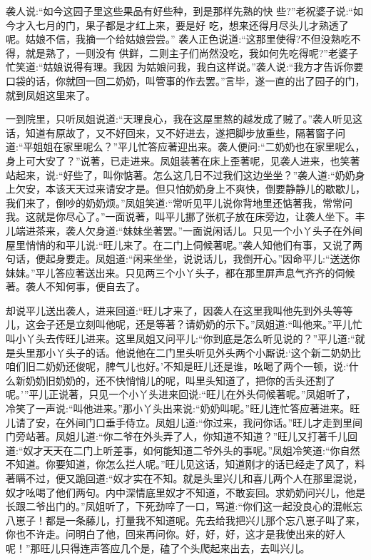 \begin{parag}
    袭人说:“如今这园子里这些果品有好些种，到是那样先熟的快
    些?”老祝婆子说:“如今才入七月的门，果子都是才红上来，要是好
    吃，想来还得月尽头儿才熟透了呢。姑娘不信，我摘一个给姑娘尝尝。”
    袭人正色说道:“这那里使得?不但没熟吃不得，就是熟了，一则没有
    供鲜，二则主子们尚然没吃，我如何先吃得呢?”老婆子忙笑道:“姑娘说得有理。我因
    为姑娘问我，我白这样说。”袭人说:“我方才告诉你要口袋的话，你就回一回二奶奶，叫管事的作去罢。”言毕，遂一直的出了园子的门，就到凤姐这里来了。
\end{parag}


\begin{parag}
    一到院里，只听凤姐说道:“天理良心，我在这屋里熬的越发成了贼了。”袭人听见这话，知道有原故了，又不好回来，又不好进去，遂把脚步放重些，隔著窗子问道:“平姐姐在家里呢么？”平儿忙答应著迎出来。袭人便问:“二奶奶也在家里呢么，身上可大安了？”说著，已走进来。凤姐装著在床上歪著呢，见袭人进来，也笑著站起来，说:“好些了，叫你惦著。怎么这几日不过我们这边坐坐？”袭人道:“奶奶身上欠安，本该天天过来请安才是。但只怕奶奶身上不爽快，倒要静静儿的歇歇儿，我们来了，倒吵的奶奶烦。”凤姐笑道:“常听见平儿说你背地里还惦著我，常常问我。这就是你尽心了。”一面说著，叫平儿挪了张杌子放在床旁边，让袭人坐下。丰儿端进茶来，袭人欠身道:“妹妹坐著罢。”一面说闲话儿。只见一个小丫头子在外间屋里悄悄的和平儿说:“旺儿来了。在二门上伺候著呢。”袭人知他们有事，又说了两句话，便起身要走。凤姐道:“闲来坐坐，说说话儿，我倒开心。”因命平儿:“送送你妹妹。”平儿答应著送出来。只见两三个小丫头子，都在那里屏声息气齐齐的伺候著。袭人不知何事，便自去了。
\end{parag}


\begin{parag}
    却说平儿送出袭人，进来回道:“旺儿才来了，因袭人在这里我叫他先到外头等等儿，这会子还是立刻叫他呢，还是等著？请奶奶的示下。”凤姐道:“叫他来。”平儿忙叫小丫头去传旺儿进来。这里凤姐又问平儿:“你到底是怎么听见说的？”平儿道:“就是头里那小丫头子的话。他说他在二门里头听见外头两个小厮说:‘这个新二奶奶比咱们旧二奶奶还俊呢，脾气儿也好。’不知是旺儿还是谁，吆喝了两个一顿，说:‘什么新奶奶旧奶奶的，还不快悄悄儿的呢，叫里头知道了，把你的舌头还割了呢。’”平儿正说著，只见一个小丫头进来回说:“旺儿在外头伺候著呢。”凤姐听了，冷笑了一声说:“叫他进来。”那小丫头出来说:“奶奶叫呢。”旺儿连忙答应著进来。旺儿请了安，在外间门口垂手侍立。凤姐儿道:“你过来，我问你话。”旺儿才走到里间门旁站著。凤姐儿道:“你二爷在外头弄了人，你知道不知道？”旺儿又打著千儿回道:“奴才天天在二门上听差事，如何能知道二爷外头的事呢。”凤姐冷笑道:“你自然不知道。你要知道，你怎么拦人呢。”旺儿见这话，知道刚才的话已经走了风了，料著瞒不过，便又跪回道:“奴才实在不知。就是头里兴儿和喜儿两个人在那里混说，奴才吆喝了他们两句。内中深情底里奴才不知道，不敢妄回。求奶奶问兴儿，他是长跟二爷出门的。”凤姐听了，下死劲啐了一口，骂道:“你们这一起没良心的混帐忘八崽子！都是一条藤儿，打量我不知道呢。先去给我把兴儿那个忘八崽子叫了来，你也不许走。问明白了他，回来再问你。好，好，好，这才是我使出来的好人呢！”那旺儿只得连声答应几个是，磕了个头爬起来出去，去叫兴儿。
\end{parag}


